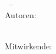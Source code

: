 {{{{{\begin{minipage}[t]{0.1\columnwidth}
                        \raisebox{-.3\columnwidth}{\qrcode[level=L, 
                                version=0,
                                height=0.9\columnwidth]{\repo}}\hfill
                        \normalfont\footnotesize{}
                    \end{minipage}\hfill
                    \begin{minipage}[t]{0.89\columnwidth}
                        \raggedright%
                        \normalfont\Huge\bfseries\title{}\\[1mm]
                        \normalfont\Large\semester\ --\ \dozent{}\\
                        \large Autoren:\ \author{}\\
                            \ifdefined\contributors
                                \normalsize\large Mitwirkende:\ \contributors{}\\[1mm]
                            \else
                                \myul{\url{\repo}}
                            \fi
                    \end{minipage}\par
                    \ifdefined\contributors
                        \small\myul{\url{\repo}}
                    \fi
}}}}}
